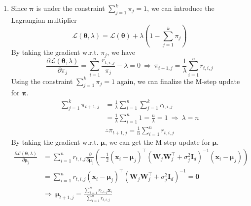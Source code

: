 \documentclass[11pt]{article}
\begin{document}
\begin{enumerate}
\begin{enumerate}
    \item
    Since $\bm\pi$ is under the constraint $\sum_{j=1}^{k}\pi_j=1$, we can introduce the Lagrangian multiplier
    \[{\mathcal{L}}(\bm\theta,\lambda)={\mathcal{L}}(\bm\theta)+\lambda\left(1-\sum_{j=1}^{k}\pi_j\right)\]
    By taking the gradient w.r.t. $\pi_j$, we have
    \[\frac{\partial{\mathcal{L}}(\bm\theta,\lambda)}{\partial\pi_j}= \sum_{i=1}^{n}\frac{r_{t,i,j}}{\pi_j}-\lambda=0\ \Rightarrow\  \pi_{t+1,j}=\frac{1}{\lambda}\sum_{i=1}^{n}r_{t,i,j}\]
    Using the constraint $\sum_{j=1}^{k}\pi_j=1$ again, we can finalize the M-step update for $\bm\pi$.
    \begin{align*}
    \sum_{j=1}^{k}\pi_{t+1,j}
    &= \frac{1}{\lambda}\sum_{i=1}^{n}\sum_{j=1}^{k}r_{t,i,j} \\
    &= \frac{1}{\lambda}\sum_{i=1}^{n}1=\frac{n}{\lambda}=1\ \Rightarrow\ \lambda=n \\
    &\therefore \pi_{t+1,j}=\frac{1}{n}\sum_{i=1}^{n}r_{t,i,j}
    \end{align*}
    By taking the gradient w.r.t. $\bm\mu$, we can get the M-step update for $\bm\mu$.
    \begin{align*}
    \frac{\partial{\mathcal{L}}(\bm\theta,\lambda)}{\partial\bm\mu_j}
    &= \sum_{i=1}^{n}r_{t,i,j}\frac{\partial}{\partial\bm\mu_{j}}\left(-\frac{1}{2}(\bm x_{i}-\bm\mu_{j})^{\top}(\bm W_j\bm W_j^{\top}+\sigma_j^2\bm I_d)^{-1}(\bm x_{i}-\bm\mu_{j})\right) \\
    &= \sum_{i=1}^{n}r_{t,i,j}(\bm x_{i}-\bm\mu_{j})^{\top}(\bm W_j\bm W_j^{\top}+\sigma_j^2\bm I_d)^{-1}=\bm 0 \\
    &\Rightarrow\ \bm\mu_{t+1,j}=\frac{\sum_{i=1}^{n}r_{t,i,j}\bm x_i}{\sum_{i=1}^{n}r_{t,i,j}}
    \end{align*}
    

\end{enumerate}
\end{enumerate}
\end{document}
